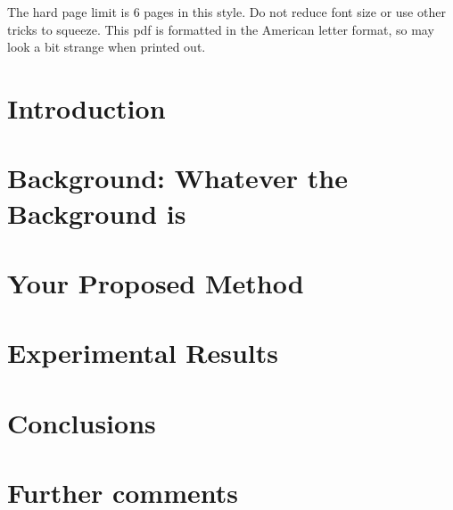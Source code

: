 


%
\maketitle
%

The hard page limit is 6 pages in this style. Do not reduce font size
or use other tricks to squeeze. This pdf is formatted in the American letter format, so may look a bit strange when printed out.

\begin{abstract}

\end{abstract}

\section{Introduction}\label{sec:intro}


\section{Background: Whatever the Background is}\label{sec:background}


\section{Your Proposed Method}\label{sec:yourmethod}


\section{Experimental Results}\label{sec:exp}


\section{Conclusions}


\section{Further comments}







